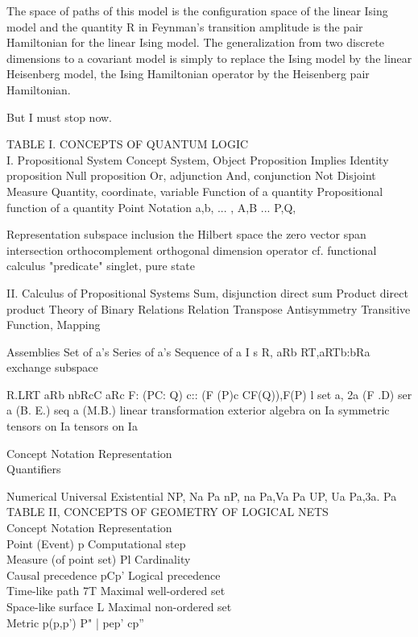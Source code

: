 The space of paths of this model is the configuration space of the linear Ising
model and the quantity R in Feynman's transition amplitude is the pair
Hamiltonian for the linear Ising model. The generalization from two discrete
dimensions to a covariant model is simply to replace the Ising model by the
linear Heisenberg model, the Ising Hamiltonian operator by the Heisenberg pair
Hamiltonian.

But I must stop now.

\bigskip\bigskip

TABLE I. CONCEPTS OF QUANTUM LOGIC
\\
I. Propositional System
Concept System, Object Proposition Implies Identity proposition
Null proposition
Or, adjunction And, conjunction Not Disjoint Measure Quantity, coordinate,
variable Function of a quantity
Propositional function of a quantity
Point
Notation a,b, ... , A,B ...
P,Q,

Representation
subspace inclusion the Hilbert space
the zero vector
span intersection orthocomplement orthogonal dimension
operator
cf. functional calculus
"predicate" singlet, pure state


II. Calculus of Propositional Systems Sum, disjunction
direct sum Product
direct product Theory of Binary Relations
Relation Transpose Antisymmetry Transitive Function, Mapping

Assemblies Set of a's
Series of a's
Sequence of a I s R, aRb RT,aRTb:bRa exchange subspace

R.LRT aRb nbRcC aRc
F: (PC: Q) c:: (F (P)c CF(Q)),F(P) l
set a, 2a (F .D) ser a (B. E.) seq a (M.B.)
linear transformation
exterior algebra on
Ia
symmetric tensors on
Ia
tensors on
Ia

Concept  Notation  Representation
\\
Quantifiers

Numerical Universal Existential  NP, Na Pa nP, na Pa,Va Pa UP, Ua Pa,3a. Pa
\\

TABLE II, CONCEPTS OF GEOMETRY OF LOGICAL NETS
\\
Concept Notation Representation
\\
Point (Event) p Computational step \\
Measure (of point set) Pl Cardinality
\\
Causal precedence pCp' Logical precedence \\
Time-like path 7T Maximal well-ordered set \\
Space-like surface L Maximal non-ordered set
\\
Metric p(p,p')  P" | pep' cp''
\\

